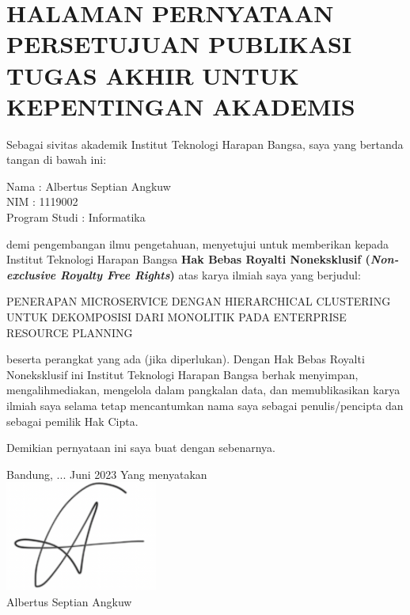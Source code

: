 \chapter*{\large HALAMAN PERNYATAAN PERSETUJUAN PUBLIKASI TUGAS AKHIR UNTUK KEPENTINGAN AKADEMIS}
	
	\noindent Sebagai sivitas akademik Institut Teknologi Harapan Bangsa, saya yang bertanda tangan di bawah ini:

	\begin{tabs}{3cm}
		\noindent Nama \tab : Albertus Septian Angkuw\\
		NIM \tab : 1119002\\
		Program Studi \tab : Informatika
	\end{tabs}
		
	\noindent demi pengembangan ilmu pengetahuan, menyetujui untuk memberikan kepada Institut Teknologi Harapan Bangsa \textbf{Hak Bebas Royalti Noneksklusif (\textit{Non-exclusive Royalty Free Rights})} atas karya ilmiah saya yang berjudul:
		
	\noindent PENERAPAN MICROSERVICE DENGAN HIERARCHICAL CLUSTERING UNTUK DEKOMPOSISI DARI MONOLITIK PADA ENTERPRISE RESOURCE PLANNING
		
	\noindent beserta perangkat yang ada (jika diperlukan). Dengan Hak Bebas Royalti Noneksklusif ini Institut Teknologi Harapan Bangsa berhak menyimpan, mengalihmediakan, mengelola dalam pangkalan data, dan memublikasikan karya ilmiah saya selama tetap mencantumkan nama saya sebagai penulis/pencipta dan sebagai pemilik Hak Cipta.
		
	\noindent Demikian pernyataan ini saya buat dengan sebenarnya.
	
	\noindent Bandung, ... Juni 2023 \newline
	\noindent Yang menyatakan \\
 	\includegraphics[width=5cm]{img/sign.png}\\
	\noindent Albertus Septian Angkuw